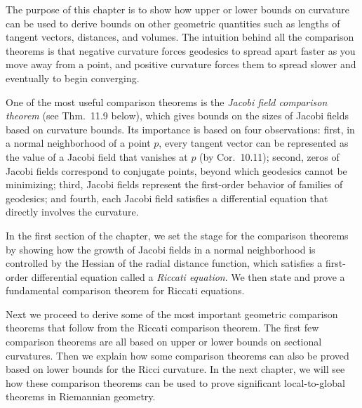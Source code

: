 
The purpose of this chapter is to show how upper or lower bounds on curvature can be used to derive bounds on other geometric quantities such as lengths of tangent vectors, distances, and volumes. The intuition behind all the comparison theorems is that negative curvature forces geodesics to spread apart faster as you move away from a point, and positive curvature forces them to spread slower and eventually to begin converging.

One of the most useful comparison theorems is the \emph{Jacobi field comparison theorem} (see Thm.~11.9 below), which gives bounds on the sizes of Jacobi fields based on curvature bounds. Its importance is based on four observations: first, in a normal neighborhood of a point $p$, every tangent vector can be represented as the value of a Jacobi field that vanishes at $p$ (by Cor.~10.11); second, zeros of Jacobi fields correspond to conjugate points, beyond which geodesics cannot be minimizing; third, Jacobi fields represent the first-order behavior of families of geodesics; and fourth, each Jacobi field satisfies a differential equation that directly involves the curvature.

In the first section of the chapter, we set the stage for the comparison theorems by showing how the growth of Jacobi fields in a normal neighborhood is controlled by the Hessian of the radial distance function, which satisfies a first-order differential equation called a \emph{Riccati equation}. We then state and prove a fundamental comparison theorem for Riccati equations.

Next we proceed to derive some of the most important geometric comparison theorems that follow from the Riccati comparison theorem. The first few comparison theorems are all based on upper or lower bounds on sectional curvatures. Then we explain how some comparison theorems can also be proved based on lower bounds for the Ricci curvature. In the next chapter, we will see how these comparison theorems can be used to prove significant local-to-global theorems in Riemannian geometry.

